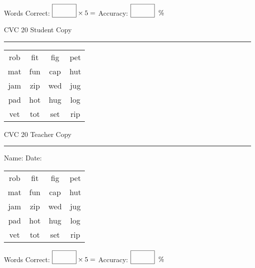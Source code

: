 \documentclass{memoir}
\begin{document}
\normalsize

Words Correct: $\fbox{\phantom{\huge 100}} \times 5 = $ Accuracy: $\fbox{\phantom{\huge 100}}\;\; \%$ 

\vfill

\newpage



\footnotesize \noindent
CVC 20 \hfill Student Copy
\smallskip
\hrule

\huge

\setlength{\tabcolsep}{14pt}
\def\arraystretch{2}

{\selectfont


\begin{vplace}[0.5]
\begin{center}
\begin{tabular}{cccc}
rob & fit & fig & pet \\
mat & fun & cap & hut \\
jam & zip & wed & jug \\
pad & hot & hug & log \\
vet & tot & set & rip \\
\end{tabular}
\end{center}
\end{vplace}

}

\newpage

\footnotesize \noindent
CVC 20 \hfill Teacher Copy
\smallskip
\hrule

\normalsize

\vfill

\noindent
Name: \underline{\hspace{1.75in}} \hfill Date: \underline{\hspace{1in}}

\huge

{\selectfont


\begin{vplace}[0.5]
\begin{center}
\begin{tabular}{cccc}
rob & fit & fig & pet \\
mat & fun & cap & hut \\
jam & zip & wed & jug \\
pad & hot & hug & log \\
vet & tot & set & rip \\
\end{tabular}
\end{center}
\end{vplace}



}

\normalsize

Words Correct: $\fbox{\phantom{\huge 100}} \times 5 = $ Accuracy: $\fbox{\phantom{\huge 100}}\;\; \%$ 

\vfill

\end{document}
